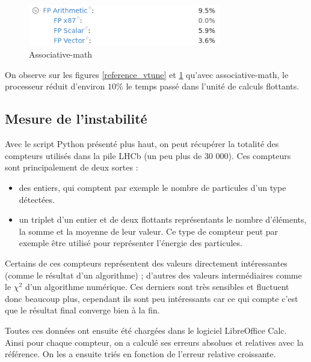 \documentclass[a4paper,11pt]{report}
\begin{document}
\begin{figure}[H]
    \includegraphics[width=0.75\textwidth, center]{associative-math_vtune.png}
    \caption{Associative-math}
    \label{associative-math_vtune}
\end{figure}

On observe sur les figures \ref{reference_vtune} et \ref{associative-math_vtune} qu'avec associative-math, le processeur réduit d'environ $10\%$ le temps passé dans l'unité de calculs flottants.

\subsection{Mesure de l'instabilité}
Avec le script Python présenté plus haut, on peut récupérer la totalité des compteurs utilisés dans la pile LHCb (un peu plus de 30 000).
Ces compteurs sont principalement de deux sortes :
\begin{itemize}
    \item des entiers, qui comptent par exemple le nombre de particules d'un type détectées.
    \item un triplet d'un entier et de deux flottants représentants le nombre d'éléments, la somme et la moyenne de leur valeur.
          Ce type de compteur peut par exemple être utilisé pour représenter l'énergie des particules.
\end{itemize}
Certains de ces compteurs représentent des valeurs directement intéressantes (comme le résultat d'un algorithme) ;
d'autres des valeurs intermédiaires comme le $\chi^2$ d'un algorithme numérique.
Ces derniers sont très sensibles et fluctuent donc beaucoup plus,
cependant ils sont peu intéressants car ce qui compte c'est que le résultat final converge bien à la fin.

Toutes ces données ont ensuite été chargées dans le logiciel LibreOffice Calc.
Ainsi pour chaque compteur, on a calculé ses erreurs absolues et relatives avec la référence.
On les a ensuite triés en fonction de l'erreur relative croissante.
\end{document}
